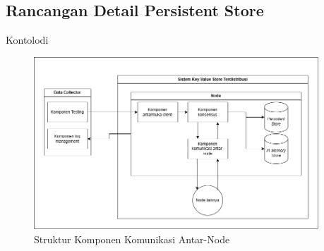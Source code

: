 \subsection{Rancangan Detail Persistent Store}
\label{subsection:detail-persistent-store}

Kontolodi

\begin{figure}[ht]
    \centering
    \includegraphics[width=0.95\textwidth]{resources/chapter-3/general-architecture.png}
    \caption{Struktur Komponen Komunikasi Antar-Node}
    \label{fig:node-communication-structure}
\end{figure}